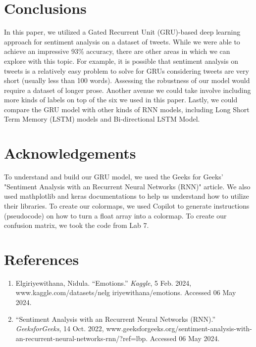 \documentclass[11pt]{article}
\begin{document}
\section{Conclusions}

In this paper, we utilized a Gated Recurrent Unit (GRU)-based deep learning approach for sentiment analysis on a dataset of tweets. While we were able to achieve an impressive 93\% accuracy, there are other areas in which we can explore with this topic. For example, it is possible that sentiment analysis on tweets is a relatively easy problem to solve for GRUs considering tweets are very short (usually less than 100 words). Assessing the robustness of our model would require a dataset of longer prose. Another avenue we could take involve including more kinds of labels on top of the six we used in this paper. Lastly, we could compare the GRU model with other kinds of RNN models, including Long Short Term Memory (LSTM) models and Bi-directional LSTM Model.

\section{Acknowledgements}

To understand and build our GRU model, we used the Geeks for Geeks' "Sentiment Analysis with an Recurrent Neural Networks (RNN)" article. We also used mathplotlib and keras documentations to help us understand how to utilize their libraries. To create our colormaps, we used Copilot to generate instructions (pseudocode) on how to turn a float array into a colormap. To create our confusion matrix, we took the code from Lab 7.

\section{References}
\begin{enumerate}
    \item Elgiriyewithana, Nidula. “Emotions.” \textit{Kaggle}, 5 Feb. 2024, www.kaggle.com/datasets/nelg iriyewithana/emotions. Accessed 06 May 2024.
    \item “Sentiment Analysis with an Recurrent Neural Networks (RNN).” \textit{GeeksforGeeks}, 14 Oct. 2022, www.geeksforgeeks.org/sentiment-analysis-with-an-recurrent-neural-networks-rnn/?ref=lbp. Accessed 06 May 2024. 
\end{enumerate}
\end{document}

